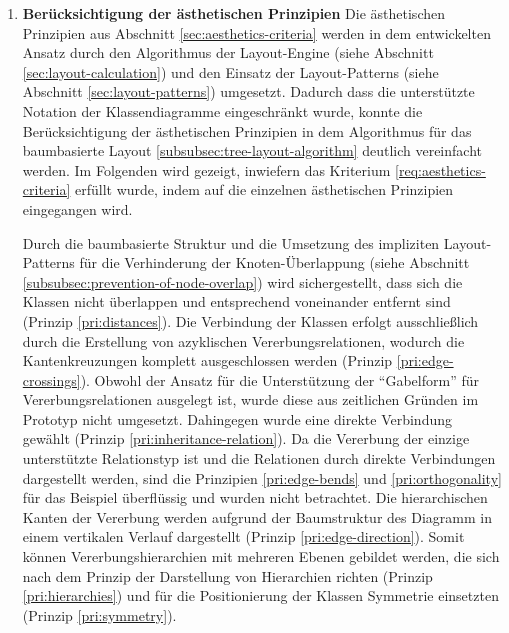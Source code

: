 \begin{enumerate}[label={K.\arabic*}]
\item
\label{eval:aesthetics-criteria}
\textbf{Berücksichtigung der ästhetischen Prinzipien}
Die ästhetischen Prinzipien aus Abschnitt \ref{sec:aesthetics-criteria} werden in dem entwickelten Ansatz durch den Algorithmus der Layout-Engine (siehe Abschnitt \ref{sec:layout-calculation}) und den Einsatz der Layout-Patterns (siehe Abschnitt \ref{sec:layout-patterns}) umgesetzt. Dadurch dass die unterstützte Notation der Klassendiagramme eingeschränkt wurde, konnte die Berücksichtigung der ästhetischen Prinzipien in dem Algorithmus für das baumbasierte Layout \ref{subsubsec:tree-layout-algorithm} deutlich vereinfacht werden. Im Folgenden wird gezeigt, inwiefern das Kriterium \ref{req:aesthetics-criteria} erfüllt wurde, indem auf die einzelnen ästhetischen Prinzipien eingegangen wird.

Durch die baumbasierte Struktur und die Umsetzung des impliziten Layout-Patterns für die Verhinderung der Knoten-Überlappung (siehe Abschnitt \ref{subsubsec:prevention-of-node-overlap}) wird sichergestellt, dass sich die Klassen nicht überlappen und entsprechend voneinander entfernt sind (Prinzip \ref{pri:distances}). Die Verbindung der Klassen erfolgt ausschließlich durch die Erstellung von azyklischen Vererbungsrelationen, wodurch die Kantenkreuzungen komplett ausgeschlossen werden (Prinzip \ref{pri:edge-crossings}). Obwohl der Ansatz für die Unterstützung der \enquote{Gabelform} für Vererbungsrelationen ausgelegt ist, wurde diese aus zeitlichen Gründen im Prototyp nicht umgesetzt. Dahingegen wurde eine direkte Verbindung gewählt (Prinzip \ref{pri:inheritance-relation}). Da die Vererbung der einzige unterstützte Relationstyp ist und die Relationen durch direkte Verbindungen dargestellt werden, sind die Prinzipien \ref{pri:edge-bends} und \ref{pri:orthogonality} für das Beispiel überflüssig und wurden nicht betrachtet. Die hierarchischen Kanten der Vererbung werden aufgrund der Baumstruktur des Diagramm in einem vertikalen Verlauf dargestellt (Prinzip \ref{pri:edge-direction}). Somit können Vererbungshierarchien mit mehreren Ebenen gebildet werden, die sich nach dem Prinzip der Darstellung von Hierarchien richten (Prinzip \ref{pri:hierarchies}) und für die Positionierung der Klassen Symmetrie einsetzten (Prinzip \ref{pri:symmetry}).

\newpage


\end{enumerate}
